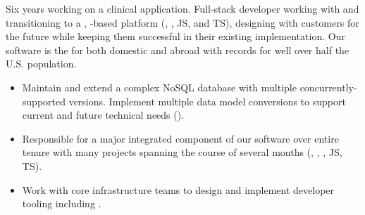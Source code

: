 \begin{position}
Six years working on a clinical application. Full-stack developer
working with  and  transitioning to a
,  -based platform
(, \CSharp, JS, and TS), designing with customers for the
future while keeping them successful in their existing implementation.
Our software is the  for  both domestic and abroad \Dash with records for well over
half the U.S. population.

  \medskip

\begin{itemize}
  \def\importantpoint{{\large$\star$\hspace*{-1pt}}}
\item Maintain and extend a complex NoSQL database with multiple
  concurrently-supported versions.  Implement multiple data model
  conversions to support current and future technical needs
  ().
\item Responsible for a major integrated component of our software
  over entire tenure \Dash with many projects spanning the course of
  several months (, , \CSharp, JS, TS).
\item Work with core infrastructure teams to design and implement
  developer tooling \Dash including .
\end{itemize}
\end{position}

